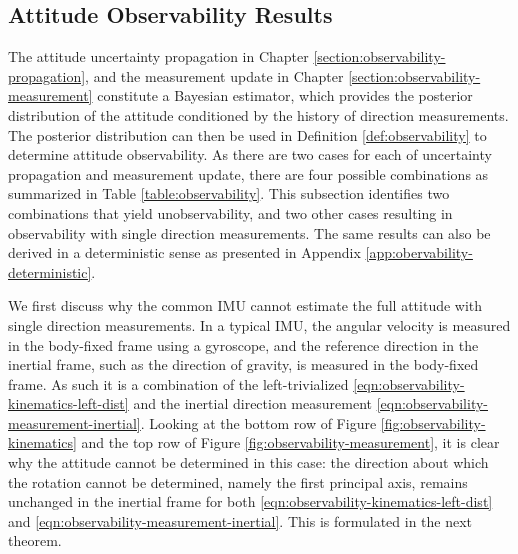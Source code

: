 \subsection{Attitude Observability Results}

The attitude uncertainty propagation in Chapter \ref{section:observability-propagation}, and the measurement update in Chapter \ref{section:observability-measurement} constitute a Bayesian estimator, which provides the posterior distribution of the attitude conditioned by the history of direction measurements.
The posterior distribution can then be used in Definition \ref{def:observability} to determine attitude observability.
As there are two cases for each of uncertainty propagation and measurement update, there are four possible combinations as summarized in Table \ref{table:observability}.
This subsection identifies two combinations that yield unobservability, and two other cases resulting in observability with single direction measurements.
The same results can also be derived in a deterministic sense as presented in Appendix \ref{app:obervability-deterministic}.

We first discuss why the common IMU cannot estimate the full attitude with single direction measurements.
In a typical IMU, the angular velocity is measured in the body-fixed frame using a gyroscope, and the reference direction in the inertial frame, such as the direction of gravity, is measured in the body-fixed frame. 
As such it is a combination of the left-trivialized \eqref{eqn:observability-kinematics-left-dist} and the inertial direction measurement \eqref{eqn:observability-measurement-inertial}.
Looking at the bottom row of Figure \ref{fig:observability-kinematics} and the top row of Figure \ref{fig:observability-measurement}, it is clear why the attitude cannot be determined in this case: the direction about which the rotation cannot be determined, namely the first principal axis, remains unchanged in the inertial frame for both \eqref{eqn:observability-kinematics-left-dist} and \eqref{eqn:observability-measurement-inertial}.
This is formulated in the next theorem.

